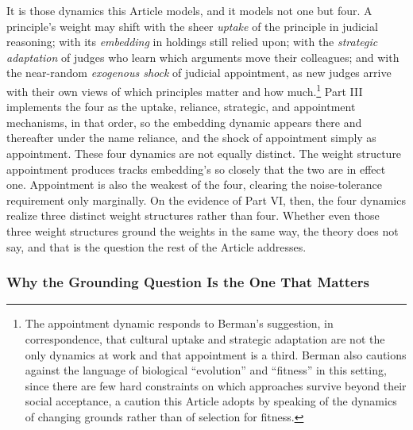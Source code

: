 It is those dynamics this Article models, and it models not one but four.
A principle's weight may shift with the sheer \textit{uptake} of the
principle in judicial reasoning; with its \textit{embedding} in holdings
still relied upon; with the \textit{strategic adaptation} of judges who
learn which arguments move their colleagues; and with the near-random
\textit{exogenous shock} of judicial appointment, as new judges arrive
with their own views of which principles matter and how
much.\footnote{The appointment dynamic responds to Berman's suggestion,
in correspondence, that cultural uptake and strategic adaptation are not
the only dynamics at work and that appointment is a third. Berman also
cautions against the language of biological ``evolution'' and ``fitness''
in this setting, since there are few hard constraints on which approaches
survive beyond their social acceptance, a caution this Article adopts by
speaking of the dynamics of changing grounds rather than of selection for
fitness.} Part III implements the four as the uptake, reliance, strategic, and
appointment mechanisms, in that order, so the embedding dynamic appears there
and thereafter under the name reliance, and the shock of appointment simply as
appointment. These four dynamics are not equally distinct. The weight structure
appointment produces tracks embedding's so closely that the two are in
effect one. Appointment is also the weakest of the four, clearing the
noise-tolerance requirement only marginally. On the evidence of Part VI,
then, the four dynamics realize three distinct weight structures rather than
four. Whether even those three weight structures
ground the weights in the same way, the theory does not say, and that is
the question the rest of the Article addresses.

\subsubsection{Why the Grounding Question Is the One That Matters}

